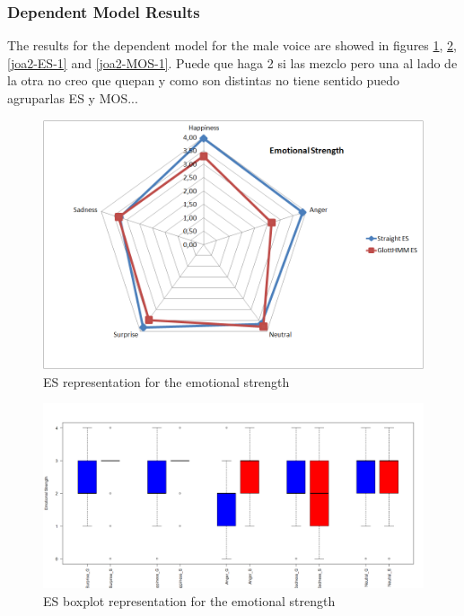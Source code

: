 \subsubsection{Dependent Model Results}\label{mdpmresults}
The results for the dependent model for the male voice are showed in figures \ref{joa1-ES-1}, \ref{joa1-MOS-1}, \ref{joa2-ES-1} and \ref{joa2-MOS-1}. Puede que haga 2 si las mezclo pero una al lado de la otra no creo que quepan y como son distintas no tiene sentido puedo agruparlas ES y MOS...
\begin{figure}[!htb]
	\begin{center}
	\includegraphics[width=1\textwidth]{results/Vocoders1_joa_ES.png}
	\end{center}
	\caption{\label{joa1-ES-1}ES representation for the emotional strength}
\end{figure}
\begin{figure}[!htb]
	\begin{center}
	\includegraphics[width=1\textwidth]{results/Vocoders1_joa_ES_boxplot.png}
	\end{center}
	\caption{\label{joa1-MOS-1}ES boxplot representation for the emotional strength}
\end{figure}
